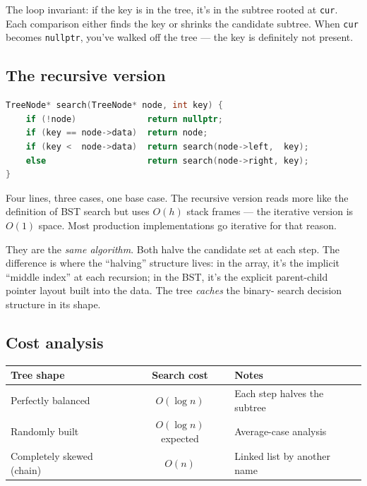 \documentclass[11pt]{article}
\begin{document}
The loop invariant: if the key is in the tree, it's in the
subtree rooted at \texttt{cur}. Each comparison either finds
the key or shrinks the candidate subtree. When \texttt{cur}
becomes \texttt{nullptr}, you've walked off the tree --- the
key is definitely not present.

\subsection*{The recursive version}

\begin{examplebox}
\begin{lstlisting}[language=C++,basicstyle=\ttfamily\small,frame=single]
TreeNode* search(TreeNode* node, int key) {
    if (!node)              return nullptr;
    if (key == node->data)  return node;
    if (key <  node->data)  return search(node->left,  key);
    else                    return search(node->right, key);
}
\end{lstlisting}
\end{examplebox}

Four lines, three cases, one base case. The recursive version
reads more like the definition of BST search but uses
$O(h)$ stack frames --- the iterative version is $O(1)$ space.
Most production implementations go iterative for that reason.

\begin{ideabox}
They are the \emph{same algorithm}. Both halve the candidate set
at each step. The difference is where the ``halving'' structure
lives: in the array, it's the implicit ``middle index'' at each
recursion; in the BST, it's the explicit parent-child pointer
layout built into the data. The tree \emph{caches} the binary-
search decision structure in its shape.
\end{ideabox}

\subsection*{Cost analysis}

\begin{center}
\begin{tabular}{|l|c|l|}
\hline
\textbf{Tree shape} & \textbf{Search cost} & \textbf{Notes} \\
\hline
Perfectly balanced  & $O(\log n)$ & Each step halves the subtree \\
Randomly built      & $O(\log n)$ expected & Average-case analysis \\
Completely skewed (chain) & $O(n)$ & Linked list by another name \\
\hline
\end{tabular}
\end{center}
\end{document}
